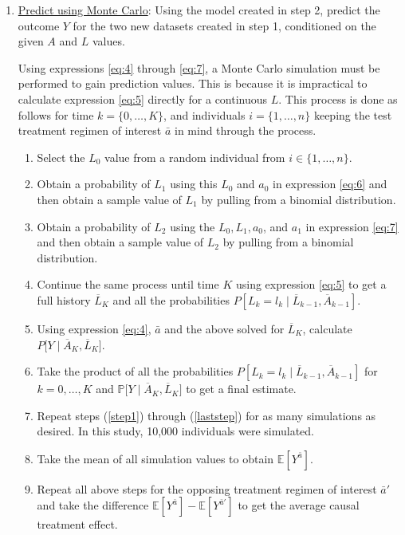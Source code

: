 \begin{enumerate}
\item \underline{Predict using Monte Carlo}: Using the model created in step 2, predict the outcome $Y$ for the two new datasets created in step 1, conditioned on the given $A$ and $L$ values.  

Using expressions \ref{eq:4} through \ref{eq:7}, a Monte Carlo simulation must be performed to gain prediction values.  This is because it is impractical to calculate expression \ref{eq:5} directly for a continuous $L$.  This process is done as follows for time $k = \{ 0, \dots, K \}$, and individuals $i = \{ 1, \dots, n \}$ keeping the test treatment regimen of interest $\bar{a}$ in mind through the process.  
\begin{enumerate} 
\item Select the $L_0$ value from a random individual from $i \in  \{ 1, \dots, n \}$. \label{step1}  
\item Obtain a probability of $L_1$ using this $L_0$ and $a_0$ in expression \ref{eq:6} and then obtain a sample value of $L_1$ by pulling from a binomial distribution.  
\item Obtain a probability of $L_2$ using the $L_0, L_1, a_0$, and $a_1$ in expression \ref{eq:7} and then obtain a sample value of $L_2$ by pulling from a binomial distribution.  
\item Continue the same process until time $K$ using expression \ref{eq:5} to get a full history $\overline{L}_K$ and all the probabilities $P[L_k = l_k \mid  \overline{L}_{k-1}, \overline{A}_{k-1}]$.  
\item Using expression \ref{eq:4}, $\bar{a}$ and the above solved for $\overline{L}_K$, calculate $P \big[Y \mid \overline{A}_K, \overline{L}_K \big]$.  
\item Take the product of all the probabilities $P[L_k = l_k \mid  \overline{L}_{k-1}, \overline{A}_{k-1}]$ for $k = 0, \dots, K$ and $\mathbb{P} \big[Y \mid \overline{A}_K, \overline{L}_K \big]$ to get a final estimate.  \label{laststep}
\item Repeat steps (\ref{step1}) through (\ref{laststep}) for as many simulations as desired.  In this study, 10,000 individuals were simulated.    
\item Take the mean of all simulation values to obtain $\mathbb{E}[Y^{\bar{a}}]$.  
\item Repeat all above steps for the opposing treatment regimen of interest $\bar{a}'$ and take the difference $\mathbb{E}[Y^{\bar{a}}] - \mathbb{E}[Y^{\bar{a}'}]$ to get the average causal treatment effect.  
\end{enumerate}
\end{enumerate} 

